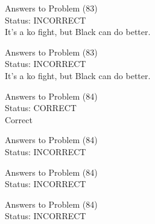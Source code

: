 \documentclass[11pt]{article}
\begin{document}
\begin{minipage}[t]{0.5\textwidth}
  {\centering
  
  Answers to Problem (83)\\
  Status: INCORRECT\\
  It's a ko fight, but Black can do better.\\
  }
\end{minipage}
\begin{minipage}[t]{0.5\textwidth}
  {\centering
  
  Answers to Problem (83)\\
  Status: INCORRECT\\
  It's a ko fight, but Black can do better.\\
  }
\end{minipage}
\begin{minipage}[t]{0.5\textwidth}
  {\centering
  
  Answers to Problem (84)\\
  Status: CORRECT\\
  Correct\\
  }
\end{minipage}
\begin{minipage}[t]{0.5\textwidth}
  {\centering
  
  Answers to Problem (84)\\
  Status: INCORRECT\\
  
  }
\end{minipage}
\begin{minipage}[t]{0.5\textwidth}
  {\centering
  
  Answers to Problem (84)\\
  Status: INCORRECT\\
  
  }
\end{minipage}
\begin{minipage}[t]{0.5\textwidth}
  {\centering
  
  Answers to Problem (84)\\
  Status: INCORRECT\\
  
  }
\end{minipage}
\end{document}
